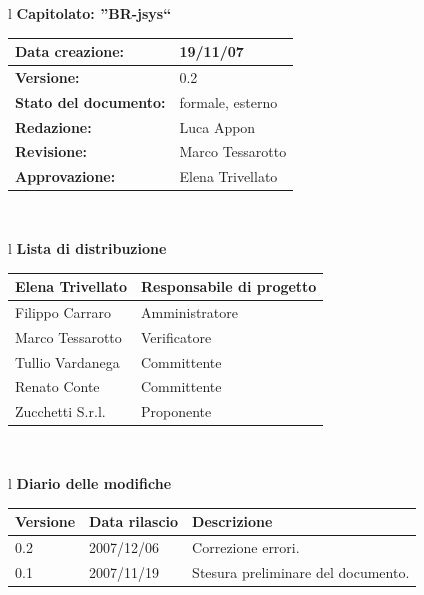 \documentclass[11pt,titlepage,a4paper]{report}
\begin{document}
\begin{center}
\thispagestyle{plain}
\begin{table}[htbp]
\large{
\begin{tabular}{l}
\Large{\textbf{\textsf{Capitolato: ''BR-jsys``}}} \\
\begin{tabular}{||p{6cm}||p{6cm}||}
\hline
\textbf{Data creazione:} & 19/11/07 \\
\hline
\textbf{Versione:} & 0.2 \\
\hline
\textbf{Stato del documento:} & formale, esterno \\
\hline
\textbf{Redazione:} & Luca Appon \\
\hline
\textbf{Revisione:} & Marco Tessarotto   \\
\hline
\textbf{Approvazione:}  & Elena Trivellato\\
\hline
\end{tabular} \\
\end{tabular}
}
\end{table}

\begin{table}[hbtp]
\large{
\begin{tabular}{l}
\Large{\textbf{\textsf{Lista di distribuzione}}} \\
\begin{tabular}{||p{6cm}||p{6cm}||}
\hline
{Elena Trivellato}& Responsabile di progetto \\ 
\hline 
{Filippo Carraro}& Amministratore \\ 
\hline
{Marco Tessarotto}& Verificatore \\
\hline
{Tullio Vardanega}& Committente \\
\hline
{Renato Conte}& Committente \\
\hline
{Zucchetti S.r.l.}& Proponente \\
\hline
\end{tabular} \\
\end{tabular}
}
\end{table}

\begin{table}[hbtp]
\large{
\begin{tabular}{l}
\Large{\textbf{\textsf{Diario delle modifiche}}} \\
\begin{tabular}{||p{2cm}||p{3.5cm}||p{6cm}||}
\hline
\textbf{Versione} & \textbf{Data rilascio} & \textbf{Descrizione} \\
\hline
0.2 & 2007/12/06& Correzione errori. \\
\hline
0.1 & 2007/11/19 & Stesura preliminare del documento. \\
\hline
\end{tabular} \\
\end{tabular}

}
\end{table}
\end{center}
\end{document}
